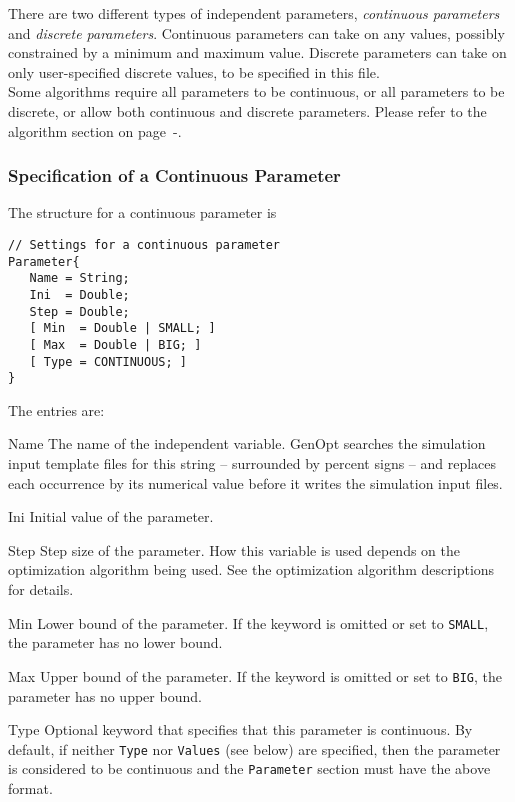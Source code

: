 There are two different types of independent parameters, 
{\em continuous parameters} and {\em discrete parameters}. 
Continuous parameters can take on any values, 
possibly constrained by a minimum and maximum value.
Discrete parameters can take on only user-specified discrete values,
to be specified in this file.\\

Some algorithms require all parameters to be continuous, 
or all parameters to be discrete, or allow both continuous and discrete parameters. 
Please refer to the algorithm section on page~\pageref{sec:algImp}-\pageref{sec:algImpEnd}.\\

\subsubsection{Specification of a Continuous Parameter}
\label{subsubsec:SpeConPar}
\noindent The structure for a continuous parameter is
\begin{lstlisting}
// Settings for a continuous parameter
Parameter{
   Name = String;
   Ini  = Double;
   Step = Double;
   [ Min  = Double | SMALL; ]
   [ Max  = Double | BIG; ]
   [ Type = CONTINUOUS; ]
}
\end{lstlisting}
The entries are:
\begin{codedescription}
\item [Name] 
The name of the independent variable.
GenOpt searches the simulation input template files for 
this string -- surrounded by percent signs -- and replaces each occurrence 
by its numerical value before it writes the simulation input files.
\item [Ini] 
Initial value of the parameter.
\item [Step] 
\label{ite:parStep}
Step size of the parameter.
How this variable is used depends on the optimization algorithm being used.
See the optimization algorithm descriptions for details.
\item [Min] 
Lower bound of the parameter.
If the keyword is omitted or set to \verb$SMALL$, the parameter has no lower bound.
\item [Max] 
Upper bound of the parameter. If the keyword is omitted or set to \verb$BIG$, the parameter has no upper bound.
\item [Type] 
Optional keyword that specifies that this parameter is continuous. By default, if neither \verb$Type$ nor \verb$Values$ (see below) are specified, then the parameter is considered to be continuous and the \verb$Parameter$ section must have the above format.
\end{codedescription}

